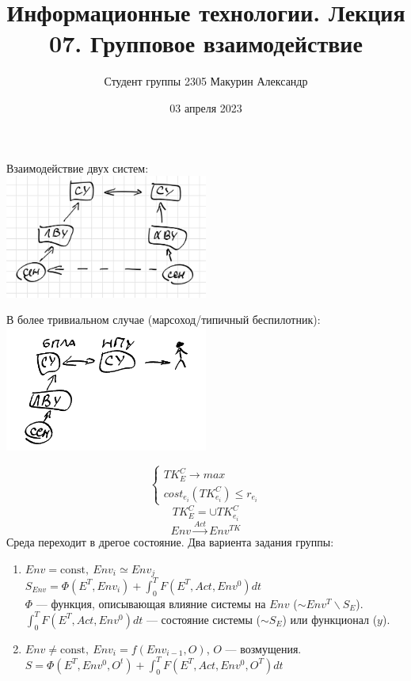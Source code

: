 \documentclass[12pt]{article}
\title{Информационные технологии. Лекция 07. Групповое взаимодействие}
\author{Студент группы 2305 Макурин Александр}
\date{03 апреля 2023}
\begin{document}
\maketitle
Взаимодействие двух систем: \\
\includegraphics[width=0.5\textwidth]{graphics/pic01.png}

В более тривиальном случае (марсоход/типичный беспилотник): \\

\includegraphics[width=0.5\textwidth]{graphics/pic02.png}

\[
    \begin{cases}
        TK^C_E \rightarrow max \\
        cost_{e_i}(TK_{e_i}^C) \leq r_{e_i}
    \end{cases}
\]
\[
    TK_E^C = \cup TK_{e_i}^C
\]
\[
    Env \xrightarrow{Act} Env^{TK}
\]
Среда переходит в дрегое состояние. Два вариента задания группы:
\begin{enumerate}
    \item $Env = \text{const}, \ Env_i \simeq Env_j$ \\
          $S_{Env} = \Phi(E^T, Env_i) + \int_{0}^{T}F(E^T, Act, Env^0)dt$\\
          $\Phi$ — функция, описывающая влияние системы на $Env$ ($\sim Env^T \backslash S_E$). $\int_{0}^{T}F(E^T, Act, Env^0)dt$ — состояние системы ($\sim S_E$) или функционал ($y$).
    \item $Env \neq \text{const}, \ Env_i = f(Env_{i - 1}, O)$, $O$ — возмущения. \\
          $S = \Phi(E^T, Env^0, O^t) + \int_{0}^{T}F(E^T, Act, Env^0, O^T)dt$
\end{enumerate}
\end{document}
